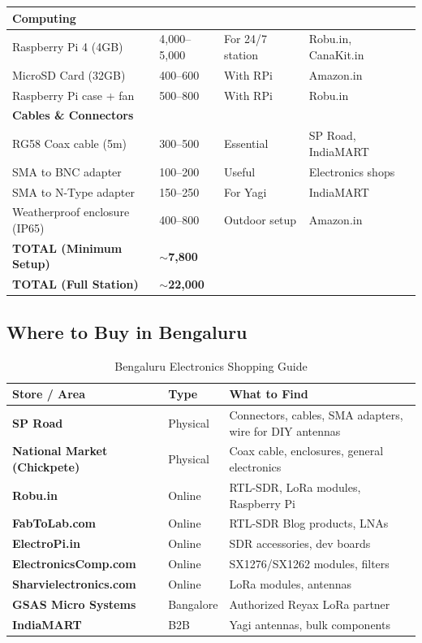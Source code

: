 \documentclass[12pt,a4paper]{article}
\begin{document}
\begin{longtable}{@{}p{4cm}p{2cm}p{2cm}p{4.5cm}@{}}
\midrule
\multicolumn{4}{l}{\textbf{Computing}} \\
\midrule
Raspberry Pi 4 (4GB) & 4,000--5,000 & For 24/7 station & Robu.in, CanaKit.in \\
MicroSD Card (32GB) & 400--600 & With RPi & Amazon.in \\
Raspberry Pi case + fan & 500--800 & With RPi & Robu.in \\

\midrule
\multicolumn{4}{l}{\textbf{Cables \& Connectors}} \\
\midrule
RG58 Coax cable (5m) & 300--500 & Essential & SP Road, IndiaMART \\
SMA to BNC adapter & 100--200 & Useful & Electronics shops \\
SMA to N-Type adapter & 150--250 & For Yagi & IndiaMART \\
Weatherproof enclosure (IP65) & 400--800 & Outdoor setup & Amazon.in \\

\midrule
\textbf{TOTAL (Minimum Setup)} & \textbf{$\sim$7,800} & & \\
\textbf{TOTAL (Full Station)} & \textbf{$\sim$22,000} & & \\
\bottomrule
\end{longtable}

\subsection{Where to Buy in Bengaluru}

\begin{table}[h!]
\centering
\caption{Bengaluru Electronics Shopping Guide}
\begin{tabular}{@{}llp{5cm}@{}}
\toprule
\textbf{Store / Area} & \textbf{Type} & \textbf{What to Find} \\
\midrule
\textbf{SP Road} & Physical & Connectors, cables, SMA adapters, wire for DIY antennas \\
\textbf{National Market (Chickpete)} & Physical & Coax cable, enclosures, general electronics \\
\textbf{Robu.in} & Online & RTL-SDR, LoRa modules, Raspberry Pi \\
\textbf{FabToLab.com} & Online & RTL-SDR Blog products, LNAs \\
\textbf{ElectroPi.in} & Online & SDR accessories, dev boards \\
\textbf{ElectronicsComp.com} & Online & SX1276/SX1262 modules, filters \\
\textbf{Sharvielectronics.com} & Online & LoRa modules, antennas \\
\textbf{GSAS Micro Systems} & Bangalore & Authorized Reyax LoRa partner \\
\textbf{IndiaMART} & B2B & Yagi antennas, bulk components \\
\bottomrule
\end{tabular}
\end{table}
\end{document}
